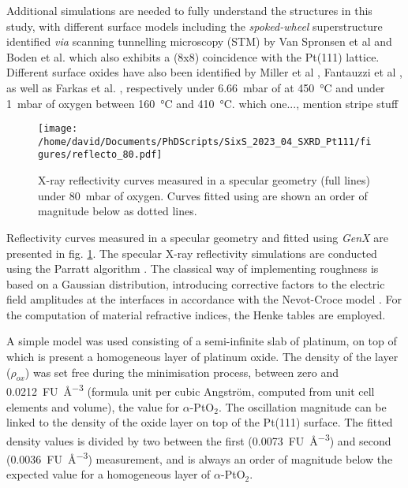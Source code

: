 Additional simulations are needed to fully understand the structures in this study, with different surface models including the \textit{spoked-wheel} superstructure identified \textit{via} scanning tunnelling microscopy (STM) by Van Spronsen et al \parencite*{VanSpronsen2017} and Boden et al. \parencite*{Boden2022} which also exhibits a (8x8) coincidence with the Pt(111) lattice.
Different surface oxides have also been identified by Miller et al \parencite*{Miller2011, Miller2014}, Fantauzzi et al \parencite*{Fantauzzi2017}, as well as Farkas et al. \parencite*{Farkas2017}, respectively under \qty{6.66}{\milli\bar} of  at \qty{450}{\degreeCelsius} and under \qty{1}{\milli\bar} of oxygen between \qty{160}{\degreeCelsius} and \qty{410}{\degreeCelsius}.
\textcolor{Important}{which one..., mention stripe stuff}

\begin{figure}[!htb]
    \centering
    \texttt{[image: /home/david/Documents/PhDScripts/SixS\_2023\_04\_SXRD\_Pt111/figures/reflecto\_80.pdf]}
    \caption{
    	X-ray reflectivity curves measured in a specular geometry (full lines) under \qty{80}{\milli\bar} of oxygen.
    	Curves fitted using  are shown an order of magnitude below as dotted lines.
    }
    \label{fig:Reflecto80}
\end{figure}

Reflectivity curves measured in a specular geometry and fitted using \textit{GenX} \parencite{Bjorck2007, Glavic2022} are presented in fig. \ref{fig:Reflecto80}.
The specular X-ray reflectivity simulations are conducted using the Parratt algorithm \parencite{Parratt1954}.
The classical way of implementing roughness is based on a Gaussian distribution, introducing corrective factors to the electric field amplitudes at the interfaces in accordance with the Nevot-Croce model \parencite{Nevot1980}.
For the computation of material refractive indices, the Henke tables \parencite{Henke1993} are employed.

A simple model was used consisting of a semi-infinite slab of platinum, on top of which is present a homogeneous layer of platinum oxide.
The density of the layer ($\rho_{ox}$) was set free during the minimisation process, between zero and \qty{0.0212}{FU\per\cubic\angstrom} (formula unit per cubic Angström, computed from unit cell elements and volume), the value for $\alpha$-PtO$_2$.
The oscillation magnitude can be linked to the density of the oxide layer on top of the Pt(111) surface.
The fitted density values is divided by two between the first (\qty{0.0073}{FU\per\cubic\angstrom}) and second (\qty{0.0036}{FU\per\cubic\angstrom}) measurement, and is always an order of magnitude below the expected value for a homogeneous layer of $\alpha$-PtO$_2$.

